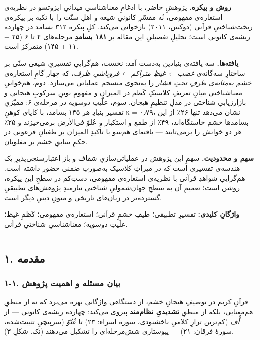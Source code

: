 \begin{RTL}
\begin{otherlanguage}{persian}
\textbf{روش و پیکره.} پژوهشِ حاضر، با ادغامِ معناشناسیِ میدانیِ ایزوتسو در
نظریه‌ی استعاره‌ی مفهومی، نُه مفسّرِ کانونیِ شیعه و اهلِ سنّت را با تکیه بر
پیکره‌ی ریخت‌شناختیِ قرآنی (دوکس، ۲۰۱۱) بازخوانی می‌کند. کلِ پیکره ۳۱۲ بسامد
در چهارده ریشه‌ی کانونی است؛ تحلیلِ تفصیلیِ این مقاله بر \textbf{۱۸۱ بسامدِ}
مرحله‌های ۴ تا ۶ (۲۵ + ۱۱ + ۱۴۵) متمرکز است.

\textbf{یافته‌ها.} سه یافته‌ی بنیادین به‌دست آمد: نخست، هم‌گراییِ تفسیریِ
شیعی-سنّی بر ساختارِ سه‌گانه‌ی \emph{غضب ← غیظِ متراکم ← فروپاشیِ ظرف}، که
چهار گامِ استعاره‌ی \emph{خشم به‌مثابه‌ی ظرفِ تحتِ فشار} را به‌نحوی منسجم
عملیاتی می‌سازد. دوم، هم‌خوانیِ معناشناختی میانِ تعریفِ کلاسیکِ کَظم در المیزان
و مفهومِ نوینِ سرکوبِ هیجانی و بازارزیابیِ شناختی در مدلِ تنظیمِ هیجان. سوم،
علّیتِ دوسویه در مرحله‌ی ۶: ممیّزیِ تفسیر-بنیادِ هر ۱۴۵ بسامد، با کاپای کوهنِ κ
= ۰٫۷۹، نشان می‌دهد تنها ۲۶٪ از این بسامدها خشم-خاستگاه‌اند، ۴۹٪ از طمع و
استکبار و عُلوّ فی‌الأرض برمی‌خیزند و ۲۵٪ هر دو خوانش را برمی‌تابند ---
یافته‌ای هم‌سو با تأکیدِ المیزان بر طغیانِ فرعونی در حکمِ سابقِ خشم بر
مغلوبان.

\textbf{سهم و محدودیت.} سهمِ این پژوهش در عملیاتی‌سازیِ شفاف و
باز-اعتبارسنجی‌پذیرِ یک هندسه‌ی تفسیری است که در میراثِ کلاسیک به‌صورتِ ضمنی
حضور داشته است. هم‌گراییِ شواهدِ قرآنی با نظریه‌ی استعاره‌ی مفهومی، دستِ‌کم در
سطحِ این پیکره، روشن است؛ تعمیمِ آن به سطحِ جهان‌شمولیِ شناختی نیازمندِ
پژوهش‌های تطبیقیِ گسترده‌تر در زبان‌های تاریخی و متونِ دینیِ دیگر است.

\textbf{واژگانِ کلیدی:} تفسیرِ تطبیقی؛ طیفِ خشمِ قرآنی؛ استعاره‌ی مفهومی؛ کَظمِ
غیظ؛ علّیتِ دوسویه؛ معناشناسیِ شناختیِ قرآنی.

\begin{center}\rule{0.5\linewidth}{0.5pt}\end{center}

\subsection{۱. مقدمه}\label{ux645ux642ux62fux645ux647}

\subsubsection{۱-۱. بیان مسئله و اهمیت
پژوهش}\label{ux628ux6ccux627ux646-ux645ux633ux626ux644ux647-ux648-ux627ux647ux645ux6ccux62a-ux67eux698ux648ux647ux634}

قرآنِ کریم در توصیفِ هیجانِ خشم، از دستگاهی واژگانی بهره می‌برد که نه از
منطقِ هم‌معنایی، بلکه از منطقِ \textbf{تشدیدیِ نظام‌مند} پیروی می‌کند: چهارده
ریشه‌ی کانونی --- از \emph{أُف} (کم‌ترین ترازِ کلامیِ ناخشنودی، سورۀ اسراء:
۲۳) تا \emph{عُتُوّ} (سرپیچیِ تثبیت‌شده، سورۀ فرقان: ۲۱) --- پیوستاری
شش‌مرحله‌ای را تشکیل می‌دهند (نک. شکلِ ۳).


\end{otherlanguage}
\end{RTL}
